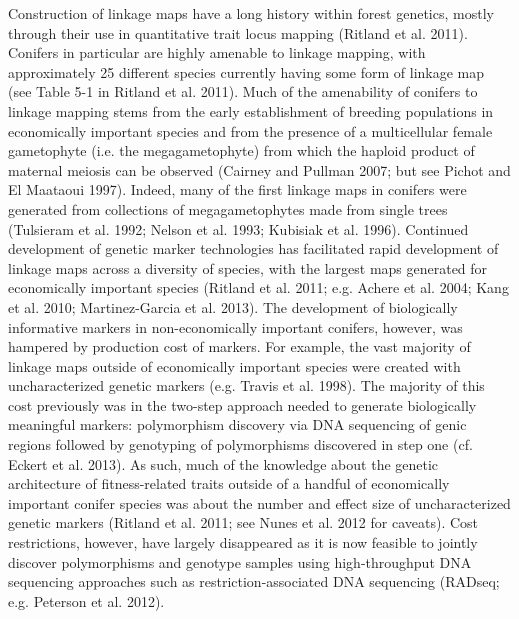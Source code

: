 \documentclass[11pt]{article}
\begin{document}
Construction of linkage maps have a long history within forest genetics, mostly through their use in quantitative trait locus mapping (Ritland et al. 2011). 
Conifers in particular are highly amenable to linkage mapping, with approximately 25 different species currently having some 
form of linkage map (see Table 5-1 in Ritland et al. 2011). Much of the amenability of conifers to linkage mapping stems from 
the early establishment of breeding populations in economically important species and from the presence of a multicellular 
female gametophyte (i.e. the megagametophyte) from which the haploid product of maternal meiosis can be observed (Cairney and Pullman 2007; 
but see Pichot and El Maataoui 1997). Indeed, many of the first linkage maps in conifers were generated from collections of 
megagametophytes made from single trees (Tulsieram et al. 1992; Nelson et al. 1993; Kubisiak et al. 1996). Continued development 
of genetic marker technologies has facilitated rapid development of linkage maps across a diversity of species, with the largest maps 
generated for economically important species (Ritland et al. 2011; e.g. Achere et al. 2004; Kang et al. 2010; Martinez-Garcia et al. 2013). 
The development of biologically informative markers in non-economically important conifers, however, was hampered by production cost of markers. 
For example, the vast majority of linkage maps outside of economically important species were created with uncharacterized genetic 
markers (e.g. Travis et al. 1998). The majority of this cost previously was in the two-step approach needed to generate biologically 
meaningful markers: polymorphism discovery via DNA sequencing of genic regions followed by genotyping of polymorphisms 
discovered in step one (cf. Eckert et al. 2013). As such, much of the knowledge about the genetic architecture of fitness-related 
traits outside of a handful of economically important conifer species was about the number and effect size of uncharacterized 
genetic markers (Ritland et al. 2011; see Nunes et al. 2012 for caveats). Cost restrictions, however, have largely disappeared 
as it is now feasible to jointly discover polymorphisms and genotype samples using high-throughput DNA sequencing approaches such as restriction-associated 
DNA sequencing (RADseq; e.g. Peterson et al. 2012). 
\end{document}
